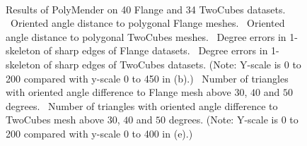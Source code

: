 \begin{figure}[p]
\quad
\\
\caption{Results of PolyMender on 40 Flange and 34 TwoCubes datasets.
\protect{}~Oriented angle distance to polygonal Flange meshes.
\protect{}~Oriented angle distance to polygonal TwoCubes meshes.
\protect{}~Degree errors in 1-skeleton of sharp edges of Flange datasets.
\protect{}~Degree errors in 1-skeleton of sharp edges of TwoCubes datasets.
(Note: Y-scale is 0 to 200 compared with y-scale 0 to 450 in (b).)
\protect{}~Number of triangles with oriented angle difference to Flange mesh 
above $30$, $40$ and $50$ degrees.
\protect{}~Number of triangles with oriented angle difference to TwoCubes mesh
above $30$, $40$ and $50$ degrees.
(Note: Y-scale is 0 to 200 compared with y-scale 0 to 400 in (e).)
}
\label{fig:polymenderA}
\end{figure}

